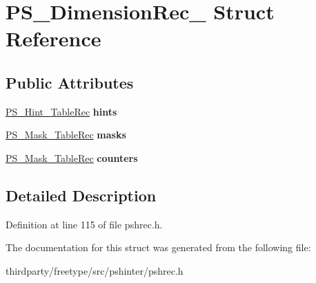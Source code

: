 \hypertarget{struct_p_s___dimension_rec__}{}\section{P\+S\+\_\+\+Dimension\+Rec\+\_\+ Struct Reference}
\label{struct_p_s___dimension_rec__}
\subsection*{Public Attributes}
\begin{DoxyCompactItemize}
\item 
\mbox{\label{struct_p_s___dimension_rec___ab17240e2369b8bfb3571dde1835b2957}} 
\hyperlink{struct_p_s___hint___table_rec__}{P\+S\+\_\+\+Hint\+\_\+\+Table\+Rec} {\bfseries hints}
\item 
\mbox{\label{struct_p_s___dimension_rec___a20947113c40dde015cff4e71b7dec4e7}} 
\hyperlink{struct_p_s___mask___table_rec__}{P\+S\+\_\+\+Mask\+\_\+\+Table\+Rec} {\bfseries masks}
\item 
\mbox{\label{struct_p_s___dimension_rec___a8d1dcd6a6eea15fe82f50f97ec0afe6c}} 
\hyperlink{struct_p_s___mask___table_rec__}{P\+S\+\_\+\+Mask\+\_\+\+Table\+Rec} {\bfseries counters}
\end{DoxyCompactItemize}


\subsection{Detailed Description}


Definition at line 115 of file pshrec.\+h.



The documentation for this struct was generated from the following file\+:\begin{DoxyCompactItemize}
\item 
thirdparty/freetype/src/pshinter/pshrec.\+h\end{DoxyCompactItemize}

